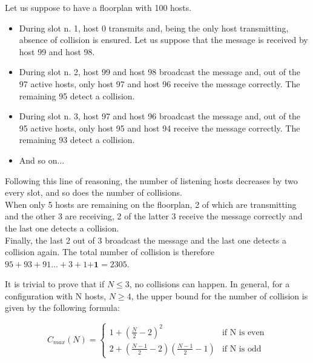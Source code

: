 \hfill \break
Let us suppose to have a floorplan with 100 hosts.\\
\begin{itemize}
	\item
	During slot n. 1, host 0 transmits and, being the only host transmitting, absence of collision is ensured. Let us suppose that the message is received by host 99 and host 98.
	\item
	During slot n. 2, host 99 and host 98 broadcast the message and, out of the 97 active hosts, only host 97 and host 96 receive the message correctly. The remaining 95 detect a collision.
	\item
	During slot n. 3, host 97 and host 96 broadcast the message and, out of the 95 active hosts, only host 95 and host 94 receive the message correctly. The remaining 93 detect a collision.
	\item
	And so on...

\end{itemize}
\hfill \break
Following this line of reasoning, the number of listening hosts decreases by two every slot, and so does the number of collisions.\\
When only 5 hosts are remaining on the floorplan, 2 of which are transmitting and the other 3 are receiving, 2 of the latter 3 receive the message correctly and the last one detects a collision.\\
Finally, the last 2 out of 3 broadcast the message and the last one detects a collision again.
\hfill \break
The total number of collision is therefore $95+93+91...+3+1\textbf{+1} = 2305$.

\hfill \break
It is trivial to prove that if $N \leq 3$, no collisions can happen.
\hfill \break
In general, for a configuration with N hosts, $N \geq 4$, the upper bound for the number of collision is given by the following formula:

\begin{equation}
\label{eq:collisionUpperBound}
	C_{max}(N) = \begin{cases}
	1+(\frac{N}{2}-2)^2 &\text{if N is even}\\
	2+(\frac{N-1}{2} - 2)(\frac{N-1}{2}-1) &\text{if N is odd}
	\end{cases}
\end{equation}
